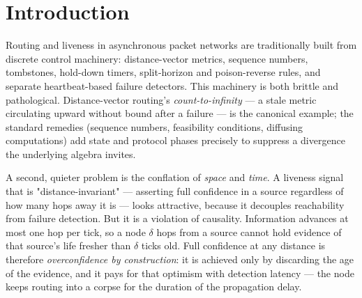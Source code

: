 \documentclass[11pt]{article}
\theoremstyle{plain}
\numberwithin{equation}{section}
\begin{document}
\begin{abstract}
We give the full proofs and exercise every theorem's prediction on an asynchronous reference implementation — the $V(\delta)$ droop, clock-free robustness under skew, the necessity of retardation, reciprocal link-aging around dead relays, graceful count-to-infinity against a textbook distance-vector baseline, data-plane delivery through node death and partition, loop-dissipativity under churn, and congestion damping that stays monotone-stable at every coupling.

\end{abstract}

\section{Introduction}\label{sec:intro}

Routing and liveness in asynchronous packet networks are traditionally built from discrete control machinery: distance-vector metrics, sequence numbers, tombstones, hold-down timers, split-horizon and poison-reverse rules, and separate heartbeat-based failure detectors. This machinery is both brittle and pathological. Distance-vector routing's \emph{count-to-infinity} — a stale metric circulating upward without bound after a failure — is the canonical example; the standard remedies (sequence numbers, feasibility conditions, diffusing computations) add state and protocol phases precisely to suppress a divergence the underlying algebra invites.

A second, quieter problem is the conflation of \emph{space} and \emph{time}. A liveness signal that is "distance-invariant" — asserting full confidence in a source regardless of how many hops away it is — looks attractive, because it decouples reachability from failure detection. But it is a violation of causality. Information advances at most one hop per tick, so a node $\delta$ hops from a source cannot hold evidence of that source's life fresher than $\delta$ ticks old. Full confidence at any distance is therefore \emph{overconfidence by construction}: it is achieved only by discarding the age of the evidence, and it pays for that optimism with detection latency — the node keeps routing into a corpse for the duration of the propagation delay.
\end{document}

